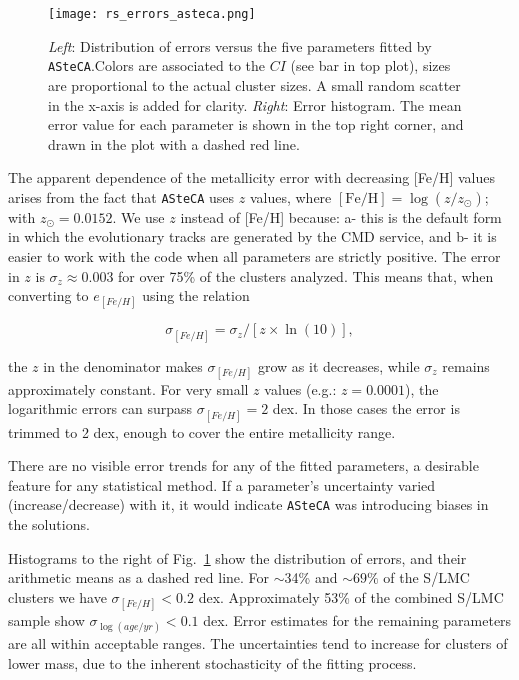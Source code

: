 \documentclass{aa}
\begin{document}
\begin{figure}[!ht]
\centering
\texttt{[image: rs\_errors\_asteca.png]}
\caption{\emph{Left}: Distribution of errors versus the five parameters fitted
by \texttt{ASteCA}.\@ Colors are associated to the $CI$ (see bar in top plot),
sizes are proportional to the actual cluster sizes. A small random scatter in
the x-axis is added for clarity.
\emph{Right}: Error histogram. The mean error value for each parameter is shown
in the top right corner, and drawn in the plot with a dashed red line.}
\label{fig:errors}
\end{figure}

The apparent dependence of the metallicity error with decreasing [Fe/H] values
arises from the fact that \texttt{ASteCA} uses $z$ values, where
$\mathrm{[Fe/H]}{=}\log(z/z_{\odot})$; with $z_{\odot}{=}0.0152$. We use $z$
instead of [Fe/H] because: a- this is the default form in which the evolutionary
tracks are generated by the CMD service, and b- it is easier to work with the
code when all parameters are strictly positive.
The error in $z$ is $\sigma_z{\approx}0.003$ for over 75\% of the clusters
analyzed. This means that, when converting to $e_{[Fe/H]}$ using the relation

\begin{equation}
\sigma_{[Fe/H]} = \sigma_z/[z\times\ln(10)],
\end{equation}

\noindent the $z$ in the denominator makes $\sigma_{[Fe/H]}$ grow as it
decreases, while $\sigma_z$ remains approximately constant.
For very small $z$ values (e.g.: $z{=}0.0001$), the logarithmic errors can
surpass $\sigma_{[Fe/H]}{=}2$ dex. In those cases the error is trimmed to 2 dex,
enough to cover the entire metallicity range.

There are no visible error trends for any of the fitted parameters, a desirable
feature for any statistical method. If a parameter's uncertainty varied 
(increase/decrease) with it, it would indicate \texttt{ASteCA} was
introducing biases in the solutions.

Histograms to the right of Fig.~\ref{fig:errors} show the distribution
of errors, and their arithmetic means as a dashed red line.
For $\sim$34\% and ${\sim}69\%$ of the S/LMC clusters we have
$\sigma_{[Fe/H]}{<}0.2$ dex.
Approximately 53\% of the combined S/LMC sample show
$\sigma_{\log(age/yr)}{<}0.1$ dex. Error estimates for the remaining parameters
are all within acceptable ranges. The uncertainties tend to increase for
clusters of lower mass, due to the inherent stochasticity of the fitting
process.\\
\end{document}
